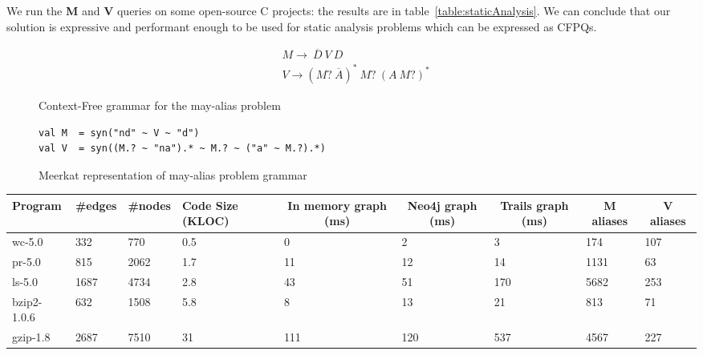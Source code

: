 We run the \textbf{M} and \textbf{V} queries on some open-source C projects: the results are in table~\ref{table:staticAnalysis}.
We can conclude that our solution is expressive and performant enough to be used for static analysis problems which can be expressed as CFPQs.

\begin{figure}[t]
\begin{align*}
& M \rightarrow\ \overline{D}\ V\ D\\
& V \rightarrow (M ?\ \overline{A})^{*} \ M?\ (A\ M?)^{*}
\end{align*}
\caption{Context-Free grammar for the may-alias problem}
\label{lst:aliasGrammar}
\end{figure}

\begin{figure}[h]
\begin{lstlisting}
val M  = syn("nd" ~ V ~ "d")
val V  = syn((M.? ~ "na").* ~ M.? ~ ("a" ~ M.?).*)
\end{lstlisting}
\caption{Meerkat representation of may-alias problem grammar}
\label{fig:aliasMeerkat}
\end{figure}


\begin{table*}[t]
\centering
\begin{tabular}{|l|lll|lll|ll|}
\hline
{Program} &
{\#edges} &
{\#nodes} &
{Code Size (KLOC)} & 

\multicolumn{1}{c|}{In memory  graph (ms)} &
\multicolumn{1}{c|}{Neo4j graph (ms)} &
\multicolumn{1}{c|}{Trails graph (ms)} &
\multicolumn{1}{c|}{M aliases} &
\multicolumn{1}{c|}{V aliases}  \\ 
\hline
\hline
wc-5.0      & 332  & 770  & 0.5 & 0   & 2   & 3   & 174  & 107 \\
pr-5.0      & 815  & 2062 & 1.7 & 11  & 12  & 14  & 1131 & 63  \\
ls-5.0      & 1687 & 4734 & 2.8 & 43  & 51  & 170 & 5682 & 253 \\
bzip2-1.0.6 & 632  & 1508 & 5.8 & 8   & 13  & 21  & 813  & 71  \\
gzip-1.8    & 2687 & 7510 & 31  & 111 & 120 & 537 & 4567 & 227 \\
\hline
\end{tabular}
\caption{Running may-alias queries on Meerkat on some C open-source projects}
\label{table:staticAnalysis}
\end{table*}


